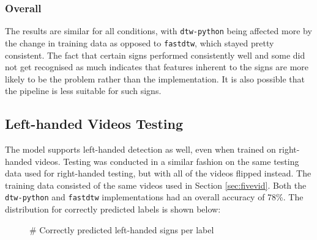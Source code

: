 \documentclass[final,rdr32.tex]{subfiles}
\begin{document}
\subsubsection{Overall}

The results are similar for all conditions, with \verb|dtw-python| being affected more by the change in training data as opposed to \verb|fastdtw|, which stayed pretty consistent. The fact that certain signs performed consistently well and some did not get recognised as much indicates that features inherent to the signs are more likely to be the problem rather than the implementation. It is also possible that the pipeline is less suitable for such signs.

\subsection{Left-handed Videos Testing}

The model supports left-handed detection as well, even when trained on right-handed videos. Testing was conducted in a similar fashion on the same testing data used for right-handed testing, but with all of the videos flipped instead. The training data consisted of the same videos used in Section \ref{sec:fivevid}. Both the \verb|dtw-python| and \verb|fastdtw| implementations had an overall accuracy of 78\%. The distribution for correctly predicted labels is shown below:

\begin{figure}[H]
    \begin{center}
    \end{center}
    \caption{\# Correctly predicted left-handed signs per label}
    \label{bar:left}
\end{figure}
\end{document}
